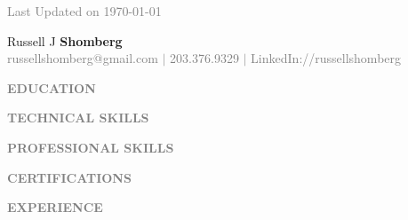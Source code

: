 \documentclass[10pt]{article}
\begin{document}
\begin{flushright}\fontsize{8pt}{10pt}
  {\textcolor{gray}{
    Last Updated on
\today}
}
\end{flushright}

\begin{center}
{\Huge{Russell J \textbf{Shomberg}}} \\
{\textcolor{gray}
{russellshomberg@gmail.com $\vert$ 203.376.9329 $\vert$ LinkedIn://russellshomberg}\\
}
\end{center}

\begin{minipage}[t]{0.29\textwidth}

{\textcolor{gray}
{\Large  \uppercase{\textbf{Education}} }
}




{\textcolor{gray}
{\Large \uppercase{\textbf{Technical Skills}}}
}



{\textcolor{gray}
{\Large \uppercase{\textbf{Professional Skills}}}
}




\end{minipage}
\hfill
\begin{minipage}[t]{0.65\textwidth}


{\textcolor{gray}
{\Large \uppercase{\textbf{Certifications}}}
}



{\textcolor{gray}
{\Large \uppercase{\textbf{Experience}}}
}





\end{minipage}
\end{document}
